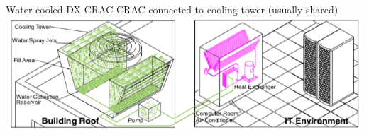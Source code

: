 \documentclass{pgslides}
\begin{document}
\begin{frame}{Water-cooled DX CRAC}
  CRAC connected to cooling tower (usually shared)
  \includegraphics[width=1.0\linewidth]{crac_dx_water_schematic}
\end{frame}

\end{document}
